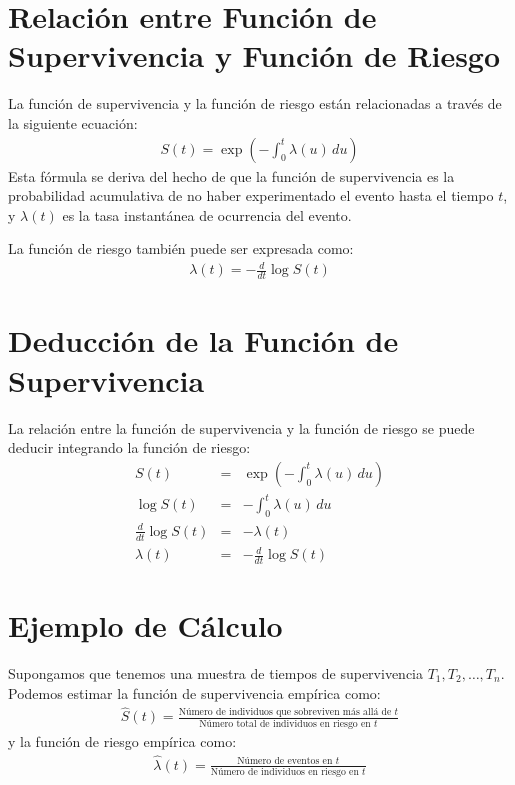 \documentclass[a4paper]{report} %
\begin{document}
\section{Relaci\'on entre Funci\'on de Supervivencia y Funci\'on de Riesgo}
La funci\'on de supervivencia y la funci\'on de riesgo est\'an relacionadas a trav\'es de la siguiente ecuaci\'on:
\begin{eqnarray*}
S(t) = \exp\left(-\int_0^t \lambda(u) \, du\right)
\end{eqnarray*}
Esta f\'ormula se deriva del hecho de que la funci\'on de supervivencia es la probabilidad acumulativa de no haber experimentado el evento hasta el tiempo $t$, y $\lambda(t)$ es la tasa instant\'anea de ocurrencia del evento.

La funci\'on de riesgo tambi\'en puede ser expresada como:
\begin{eqnarray*}
\lambda(t) = -\frac{d}{dt} \log S(t)
\end{eqnarray*}

\section{Deducci\'on de la Funci\'on de Supervivencia}
La relaci\'on entre la funci\'on de supervivencia y la funci\'on de riesgo se puede deducir integrando la funci\'on de riesgo:
\begin{eqnarray*}
S(t) &=& \exp\left(-\int_0^t \lambda(u) \, du\right) \\
\log S(t) &=& -\int_0^t \lambda(u) \, du \\
\frac{d}{dt} \log S(t) &=& -\lambda(t) \\
\lambda(t) &=& -\frac{d}{dt} \log S(t)
\end{eqnarray*}

\section{Ejemplo de C\'alculo}
Supongamos que tenemos una muestra de tiempos de supervivencia $T_1, T_2, \ldots, T_n$. Podemos estimar la funci\'on de supervivencia emp\'irica como:
\begin{eqnarray*}
\hat{S}(t) = \frac{\text{N\'umero de individuos que sobreviven m\'as all\'a de } t}{\text{N\'umero total de individuos en riesgo en } t}
\end{eqnarray*}
y la funci\'on de riesgo emp\'irica como:
\begin{eqnarray*}
\hat{\lambda}(t) = \frac{\text{N\'umero de eventos en } t}{\text{N\'umero de individuos en riesgo en } t}
\end{eqnarray*}
\end{document}
